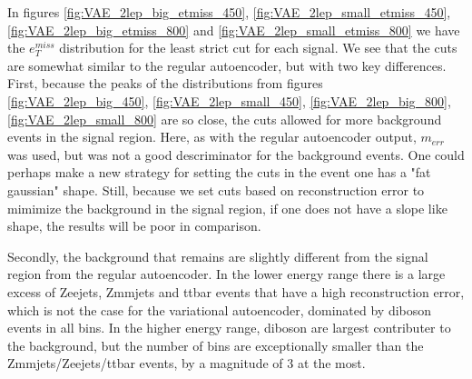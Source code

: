 In figures \ref{fig:VAE_2lep_big_etmiss_450}, \ref{fig:VAE_2lep_small_etmiss_450}, 
\ref{fig:VAE_2lep_big_etmiss_800} and  \ref{fig:VAE_2lep_small_etmiss_800} we have 
the $e_T^{miss}$ distribution for the least strict cut for each signal. We see that 
the cuts are somewhat similar to the regular autoencoder, but with two key differences.
First, because the peaks of the distributions from figures \ref{fig:VAE_2lep_big_450}, 
\ref{fig:VAE_2lep_small_450}, \ref{fig:VAE_2lep_big_800}, \ref{fig:VAE_2lep_small_800} 
are so close, the cuts allowed for more background events in the signal region. Here, 
as with the regular autoencoder output, $m_{err}$ was used, but was not a good descriminator 
for the background events. One could perhaps make a new strategy for setting the cuts in 
the event one has a "fat gaussian" shape. Still, because we set cuts based on reconstruction 
error to mimimize the background in the signal region, if one does not have a slope like shape, 
the results will be poor in comparison. \par 
Secondly, the background that remains are slightly 
different from the signal region from the regular autoencoder. In the lower energy range there 
is a large excess of Zeejets, Zmmjets and ttbar events that have a high reconstruction error, 
which is not the case for the variational autoencoder, dominated by diboson events in all bins. 
In the higher energy range, diboson are largest contributer to the background, but the number 
of bins are exceptionally smaller than the Zmmjets/Zeejets/ttbar events, by a magnitude of 3 at the most. 


 
